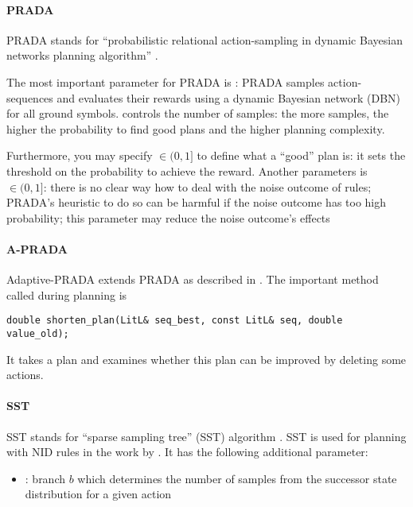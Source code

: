 \documentclass[10pt,twoside,twocolumn,fleqn]{article}
\begin{document}
\paragraph{PRADA}

PRADA stands for ``probabilistic relational action-sampling in dynamic
Bayesian networks planning algorithm'' \cite{lang-toussaint-10jair}. 

The most important parameter for PRADA is : PRADA
samples action-sequences and evaluates their rewards using a dynamic
Bayesian network (DBN)  for all ground symbols.
 controls the number of samples: the more samples, the
higher the probability to find good plans and the higher planning
complexity.

Furthermore, you may specify  $\in (0,1]$ to define
what a ``good'' plan is: it sets the threshold on the probability to
achieve the reward. Another parameters is  $\in
(0,1]$: there is no clear way how to deal with the noise outcome of rules;
PRADA's heuristic to do so can be harmful if the noise outcome has too high
probability; this parameter may reduce the noise outcome's effects



\paragraph{A-PRADA}

Adaptive-PRADA extends PRADA as described in \cite{lang-toussaint-10jair}.
The important method called during planning is 
\begin{lstlisting}
double shorten_plan(LitL& seq_best, const LitL& seq, double value_old);
\end{lstlisting}
It takes a plan and examines whether this plan can be improved by deleting
some actions.


\paragraph{SST}

SST stands for ``sparse sampling tree'' (SST) algorithm
\citep{kearns02ss}. SST is used for planning with NID rules in the work by
\cite{pasula07ai}. It has the following additional parameter:
\begin{itemize}
\item {}: branch $b$ which determines the number of samples from
the successor state distribution for a given action
\end{itemize}
\end{document}
